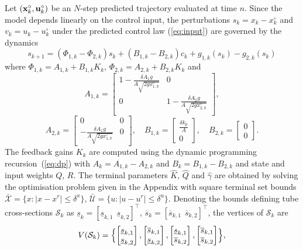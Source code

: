 \documentclass[a4paper, 10 pt, conference]{IEEEconf}
\def\S{\mathcal{S}}
\def\U{\mathcal{U}}
\def\X{\mathcal{X}}
\begin{document}
Let $({\bf x}_k^\circ, {\bf u}_k^\circ)$ be an $N$-step predicted trajectory evaluated at time $n$. Since the model depends linearly on the control input, the perturbations $s_k = x_k - x_k^\circ$ and $v_k = u_k - u_k^\circ$ under the predicted control law (\ref{eq:input}) are governed by the dynamics
 \[
 s_{k+1} = (\Phi_{1, k}- \Phi_{2, k}) s_k + (B_{1,k} - B_{2,k}) c_k + g_{1, k}(s_k) -  g_{2, k}(s_k)
 \]
 where $\Phi_{1, k} = A_{1, k} + B_{1, k} K_{k} $, $\Phi_{2, k} = A_{2, k} +  B_{2, k} K_{k}$ and
\[
A_{1, k} = \begin{bmatrix}
     1 - \frac{\delta A_1 g}{A \sqrt{2 g x_{1, k}^\circ}}   & 0\\
      0 & 1 - \frac{\delta A_2 g}{A \sqrt{2 g x_{2, k}^\circ}}
\end{bmatrix},
\]
\[
A_{2, k} = \begin{bmatrix}
     0  & 0\\
      - \frac{\delta A_1 g}{A \sqrt{2 g x_{1, k}^\circ}}  & 0
\end{bmatrix}, \quad 
B_{1, k} = \begin{bmatrix}
     \frac{\delta k_p}{A}\\
     0
\end{bmatrix}, \quad
B_{2, k} = \begin{bmatrix}
     0\\
     0
\end{bmatrix}. 
\]
The feedback gains $K_k$ are computed using the dynamic programming recursion~(\ref{eq:dp}) with $A_k = A_{1, k}-A_{2, k}$ and $B_k=B_{1, k}-B_{2, k}$ and state and input weights $Q$, $R$.
The terminal parameters $\hat{K}$, $\hat{Q}$ and $\hat{\gamma}$ are obtained by solving the optimisation problem given in the Appendix with square terminal set bounds $\bar{\X} = \{x : \lvert x-x^r \rvert \leq \delta^x\}$, $\bar{\U} = \{u : \lvert u-u^r \rvert \leq \delta^u\}$.
%
Denoting the bounds defining tube cross-sections $\S_k$ as $\underline{s}_k = [\underline{s}_{k,1} \ \ \underline{s}_{k,2}]^\top$,
$\overline{s}_k = [\overline{s}_{k,1} \ \ \overline{s}_{k,2}]^\top$,
the vertices of $\S_k$ are
\[V(\S_k) = \Bigl\{ \begin{bmatrix} \underline{s}_{k, 1}\\ \underline{s}_{k, 2} \end{bmatrix}, \begin{bmatrix} \overline{s}_{k, 1}\\ \underline{s}_{k, 2} \end{bmatrix}, \begin{bmatrix} \underline{s}_{k, 1}\\ \overline{s}_{k, 2} \end{bmatrix}, \begin{bmatrix} \overline{s}_{k, 1}\\ \overline{s}_{k, 2} \end{bmatrix}\Bigr\}, 
\] 
\end{document}
